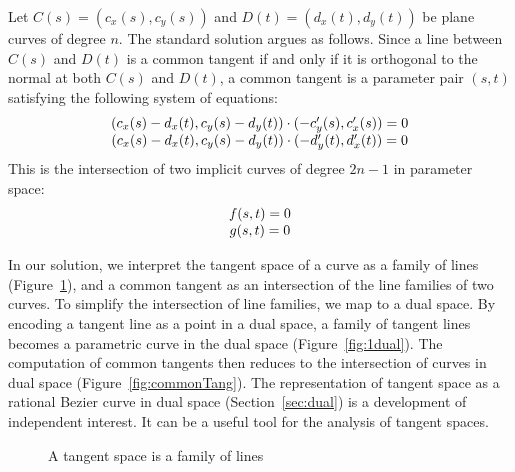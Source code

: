 \documentclass[9pt,twocolumn]{article}
\begin{document}
Let $C(s) = (c_x(s),c_y(s))$ and $D(t) = (d_x(t),d_y(t))$ be 
plane curves of degree $n$.
The standard solution \cite{bajajkim87,parida95} argues as follows.
Since a line between $C(s)$ and $D(t)$ is a common tangent if and only if 
it is orthogonal to the normal at both $C(s)$ and $D(t)$,
a common tangent is a parameter pair $(s,t)$ satisfying the following
system of equations:
%
\[
\begin{tabular}{c}
$(c_x(s) - d_x(t), c_y(s) - d_y(t)) \cdot (-c_y'(s), c_x'(s)) = 0$\\
$(c_x(s) - d_x(t), c_y(s) - d_y(t)) \cdot (-d_y'(t), d_x'(t)) = 0$
\end{tabular}
\]
%
This is the intersection of two implicit curves of degree $2n-1$
in parameter space:
\[
\begin{tabular}{c}
$f(s,t)=0$\\
$g(s,t)=0$
\end{tabular}
\]


In our solution, we interpret the tangent space of a curve as a family of lines
(Figure~\ref{fig:linefamily}),
and a common tangent as an intersection of the line families of two curves.
To simplify the intersection of line families,
we map to a dual space. %
By encoding a tangent line as a point in a dual space,
a family of tangent lines becomes a parametric curve in the dual space
(Figure~\ref{fig:1dual}).
The computation of common tangents then reduces to the intersection of 
curves in dual space (Figure~\ref{fig:commonTang}).
The representation of tangent space as a rational Bezier curve in dual space
(Section~\ref{sec:dual}) is a development of independent interest.
It can be a useful tool for the analysis of tangent spaces.



\begin{figure}
\hspace{.5in} \setjjdufam
\caption{A tangent space is a family of lines}
\label{fig:linefamily}
\end{figure}
\end{document}
